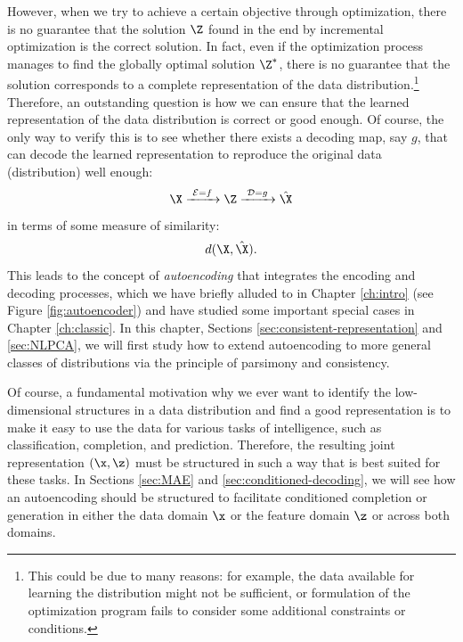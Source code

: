\documentclass[../../book-main.tex]{subfiles}
\begin{document}
However, when we try to achieve a certain objective through
optimization, there is no guarantee that the solution $\Z$ found in
the end by incremental optimization is the correct solution. In fact, even if
the optimization process manages to find the globally optimal
solution $\Z^*$, there is no guarantee that the solution corresponds
to a complete representation of the data distribution.\footnote{This could be due to many reasons: for example, the data available for learning the distribution might not be sufficient, or formulation of the optimization program fails to consider some additional constraints or conditions.} Therefore, an outstanding question is how we can ensure that the learned representation of the data distribution is
correct or good enough. Of course, the only way to verify this is to
see whether there exists a decoding map, say $g$, that can decode the
learned representation to reproduce the original data (distribution)
well enough:
\begin{equation}
  \X
  \xrightarrow{\hspace{1mm} \mathcal{E} = f \hspace{1mm}} \Z
  \xrightarrow{\hspace{1mm} \mathcal{D} = g \hspace{1mm}} \hat{\X}
\end{equation}
in terms of some measure of similarity:
\begin{equation}
  d(\X, \hat \X).
\end{equation}
This leads to the concept of {\em autoencoding} that integrates the
encoding and decoding processes, which we have briefly alluded to in
Chapter \ref{ch:intro} (see Figure \ref{fig:autoencoder}) and have
studied some important special cases in Chapter \ref{ch:classic}. In
this chapter, Sections \ref{sec:consistent-representation} and
\ref{sec:NLPCA}, we will first study how to extend autoencoding to
more general classes of distributions via the principle of parsimony and consistency.

Of course, a fundamental motivation why we ever want to identify the
low-dimensional structures in a data distribution and find a good
representation is to make it easy to use the data for various tasks
of intelligence, such as classification, completion, and prediction.
Therefore, the resulting joint representation $(\x, \z)$ must be
structured in such a way that is best suited for these tasks. In
Sections \ref{sec:MAE} and \ref{sec:conditioned-decoding}, we will
see how an autoencoding should be structured to facilitate
conditioned completion or generation in either the data domain $\x$
or the feature domain $\z$ or across both domains.
\end{document}
